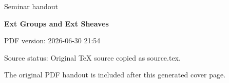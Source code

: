 \documentclass[11pt,a4paper]{article}
\newcommand{\seminartitle}{Ext Groups and Ext Sheaves}
\newcommand{\seminarsubtitle}{Seminar handout}
\newcommand{\seminardate}{2026-06-30 21:54}
\newcommand{\seminarsourcestatus}{Original TeX source copied as source.tex.}
\begin{document}
\begin{titlepage}
\thispagestyle{empty}
\vspace*{0.16\textheight}
{\Large\color{seminarblue}\seminarsubtitle\par}
\vspace{1.5em}
{\LARGE\bfseries \seminartitle\par}
\vspace{2em}
{\large PDF version: \seminardate\par}
\vfill
{\small Source status: \seminarsourcestatus\par}
\vspace{1em}
{\small The original PDF handout is included after this generated cover page.\par}
\end{titlepage}

\clearpage
\hypersetup{pageanchor=false}

\end{document}
